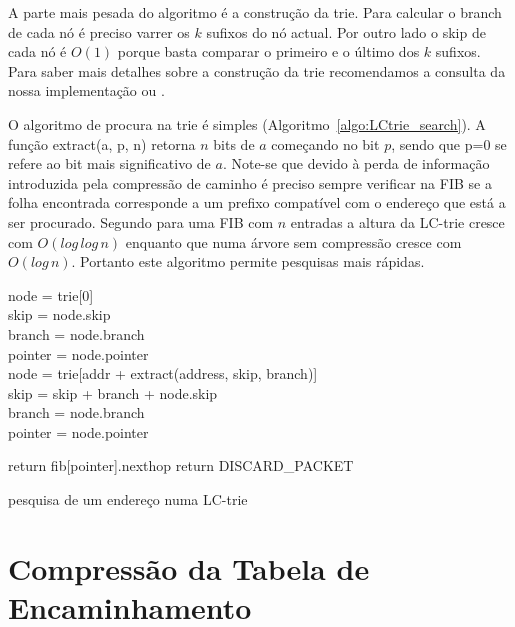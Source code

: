 \documentclass[10pt,a4paper]{article}
\begin{document}
A parte mais pesada do algoritmo é a construção da trie. Para calcular o branch de cada nó é preciso varrer os $k$ sufixos do nó actual. Por outro lado o skip de cada nó é $O(1)$ porque basta comparar o primeiro e o último dos $k$ sufixos. Para saber mais detalhes sobre a construção da trie recomendamos a consulta da nossa implementação ou \cite{SNilsson99}.

O algoritmo de procura na trie é simples (Algoritmo~\ref{algo:LCtrie_search}). A função extract(a, p, n) retorna $n$ bits de $a$ começando no bit $p$, sendo que p=0 se refere ao bit mais significativo de $a$. Note-se que devido à perda de informação introduzida pela compressão de caminho é preciso sempre verificar na FIB se a folha encontrada corresponde a um prefixo compatível com o endereço que está a ser procurado. Segundo \cite{SNilsson99} para uma FIB com $n$ entradas a altura da \mbox{LC-trie} cresce com $O(log \, log \, n)$ enquanto que numa árvore sem compressão cresce com $O(log \, n)$. Portanto este algoritmo permite pesquisas mais rápidas.

\begin{algorithm}
	\label{algo:LCtrie_search}

	node = trie[0] \\
	skip = node.skip \\
	branch = node.branch \\
	pointer = node.pointer \\
	{
		node = trie[addr + extract(address, skip, branch)] \\
		skip = skip + branch + node.skip \\
		branch = node.branch \\
		pointer = node.pointer \\
	}
	
	{
		return fib[pointer].nexthop
	}
	\Else
	{
		return DISCARD\_PACKET
	}

		\begin{comment}
			node = trie[0]
			skip = node.skip
			branch = node.branch
			pointer = node.pointer
			
			while( branch != 0 )
			{
				node = trie[addr + extract(address, skip, branch)]
				skip = skip + branch + node.skip
				branch = node.branch
				pointer = node.pointer
			}
			
			if( address starts with fib[pointer].prefix )
				return fib[pointer].nexthop
			else
				return DISCARD_PACKET \\
		\end{comment}
	\caption{pesquisa de um endereço numa LC-trie}
\end{algorithm}

\section{Compressão da Tabela de Encaminhamento}

	
	
\end{document}
